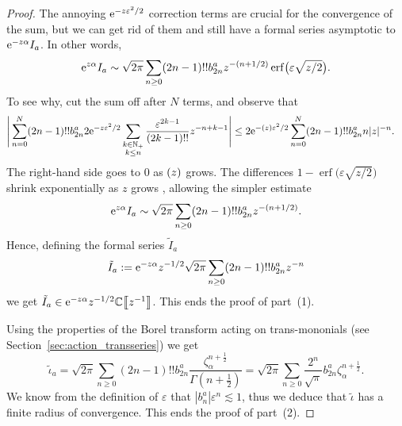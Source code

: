\documentclass[pdftex]{sigma}
\let\Re\relax
\DeclareMathOperator{\Re}{Re}
\newcommand{\C}{\mathbb{C}}
\newcommand{\series}[1]{\tilde{#1}}
\numberwithin{equation}{section}
\begin{document}
\begin{proof}
The annoying ${\rm e}^{-z\varepsilon^2/2}$ correction terms are crucial for the convergence of the sum, but we can get rid of them and still have a formal series asymptotic to ${\rm e}^{-z \alpha} I_a$. In other words,
\[ {\rm e}^{z \alpha} I_a \sim \sqrt{2\pi} \sum_{n \ge 0} (2n-1)!! b_{2n}^a z^{-(n+1/2)} \operatorname{erf}\bigl(\varepsilon \sqrt{z/2}\bigr). \]
To see why, cut the sum off after $N$ terms, and observe that
\begin{align*}
 \Bigg | \sum_{n= 0}^N(2n-1)!! b_{2n}^a 2{\rm e}^{-z\varepsilon^2/2} \sum_{\substack{k \in \mathbb{N}_+ \\ k \le n}} \frac{\varepsilon^{2k-1}}{(2k-1)!!} z^{-n+k-1} \Bigg | &\leq 2 {\rm e}^{-\Re (z) \varepsilon^2/2} \sum_{n=0}^N(2n-1)!! b_{2n}^a n|z|^{-n}.
\end{align*}
The right-hand side goes to $0$ as $\Re(z)$ grows. The differences $1 - \operatorname{erf}\bigl(\varepsilon \sqrt{z/2}\bigr)$ shrink exponentially as $z$ grows \cite[inequality~(5)]{chiani-dardari-book}, allowing the simpler estimate
\[ {\rm e}^{z\alpha} I_a \sim \sqrt{2\pi} \sum_{n \ge 0} (2n-1)!! b_{2n}^a z^{-(n+1/2)}. \]
Hence, defining the formal series $\series{I}_a$
\[\series{I}_a := {\rm e}^{-z\alpha} z^{-1/2} \sqrt{2\pi} \sum_{n \ge 0} (2n-1)!! b_{2n}^a z^{-n}\]
we get $\series{I}_a \in {\rm e}^{-z\alpha}z^{-1/2}\C\big\llbracket z^{-1}\big\rrbracket$. This ends the proof of part~(1).

Using the properties of the Borel transform acting on trans-mononials (see Section~\ref{sec:action_transseries}) we get
\begin{equation*}
\series{\iota}_a = \sqrt{2\pi} \sum_{n \ge 0} (2n - 1)!! b_{2n}^a \frac{\zeta_\alpha^{n+\frac{1}{2}}}{\Gamma(n+\frac{1}{2})} = \sqrt{2\pi} \sum_{n \ge 0} \frac{2^n}{\sqrt{\pi}} b_{2n}^a \zeta_\alpha^{n+\frac{1}{2}}.
\end{equation*}
We know from the definition of $\varepsilon$ that $\left|b_n^a\right| \varepsilon^n \lesssim 1$, thus we deduce that $\series{\iota}$ has a finite radius of convergence. This ends the proof of part~(2).


\end{proof}
\end{document}
